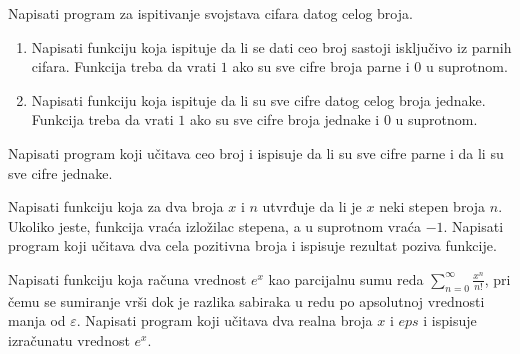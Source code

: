 \begin{Exercise}[label=v1.4_10] 
Napisati program za ispitivanje svojstava cifara datog celog broja.
\begin{enumerate}
\item Napisati funkciju  koja ispituje da li
  se dati ceo broj sastoji isključivo iz parnih cifara. Funkcija treba
  da vrati $1$ ako su sve cifre broja parne i $0$ u suprotnom.
\item Napisati funkciju  koja ispituje da
  li su sve cifre datog celog broja jednake. Funkcija treba da vrati $1$
  ako su sve cifre broja jednake i $0$ u suprotnom.
\end{enumerate}
Napisati program koji učitava ceo broj i ispisuje da li su sve cifre
parne i da li su sve cifre jednake.

\end{Exercise}
\begin{Answer}[ref=v1.4_10]
\end{Answer}

\begin{Exercise}[label=v1.4_11] 
Napisati funkciju  koja
za dva broja $x$ i $n$ utvrđuje da li je $x$ neki stepen broja
$n$. Ukoliko jeste, funkcija vraća izložilac stepena, a u suprotnom
vraća $-1$. Napisati program koji učitava dva cela pozitivna broja i
ispisuje rezultat poziva funkcije.

\end{Exercise}
\begin{Answer}[ref=v1.4_11]
\end{Answer}

\begin{Exercise}[label=v1.4_12] 
Napisati funkciju  koja
računa vrednost $e^x$ kao parcijalnu sumu reda
$\sum_{n=0}^{\infty}\frac{x^n}{n!}$, pri čemu se sumiranje vrši dok je
razlika sabiraka u redu po apsolutnoj vrednosti manja od
$\varepsilon$. Napisati program koji učitava dva realna broja $x$ i
$eps$ i ispisuje izračunatu vrednost $e^x$.

\end{Exercise}
\begin{Answer}[ref=v1.4_12]
\end{Answer}

